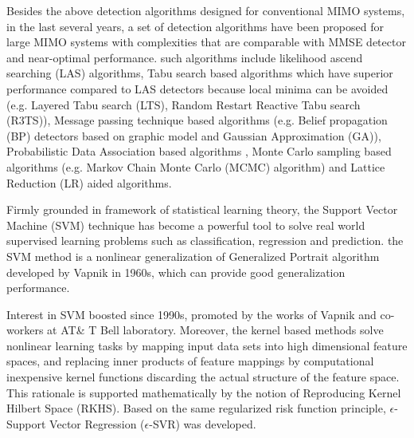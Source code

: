 \documentclass[12pt, draftclsnofoot, onecolumn]{IEEEtran}
\begin{document}
\begin{spacing}{2}
Besides the above detection algorithms designed for conventional MIMO systems, in the last several years, a set of detection algorithms have been proposed for large MIMO systems with complexities that are comparable with MMSE detector and near-optimal performance. such algorithms include likelihood ascend searching (LAS) algorithms\cite{vardhan2008low}\cite{li2010multiple}, %
Tabu search based algorithms which have superior performance compared to LAS detectors because local minima can be avoided (e.g. Layered Tabu search (LTS)\cite{srinidhi2011layered}, Random Restart Reactive Tabu search (R3TS)\cite{datta2010random}), Message passing technique based algorithms (e.g. Belief propagation (BP) detectors based on graphic model and Gaussian Approximation (GA)\cite{som2011low}\cite{som2010improved}\cite{narasimhan2014channel}\cite{goldberger2011mimo}), Probabilistic Data Association based algorithms \cite{mohammed2009low}, Monte Carlo sampling based algorithms (e.g. Markov Chain Monte Carlo (MCMC) algorithm\cite{datta2013novel}) and Lattice Reduction (LR) aided algorithms\cite{zhou2013element}.

Firmly grounded in framework of statistical learning theory, the Support Vector Machine (SVM) technique has become a powerful tool to solve real world supervised learning problems such as classification, regression and prediction. the SVM method is a nonlinear generalization of Generalized Portrait algorithm developed by Vapnik in 1960s\cite{vapnik1963pattern}\cite{vapnik1964note}, which can provide good generalization performance\cite{scholkopf2002learning}.

Interest in SVM boosted since 1990s, promoted by the works of Vapnik and co-workers at AT\& T Bell laboratory\cite{boser1992training}\cite{guyon1993automatic}\cite{vapnik2013nature}\cite{cortes1995support}\cite{scholkopf1996incorporating}\cite{vapnik1996support}.
Moreover, the kernel based methods\cite{scholkopf2002learning} solve nonlinear learning tasks by mapping input data sets into high dimensional feature spaces, and replacing inner products of feature mappings by computational inexpensive kernel functions discarding the actual structure of the feature space. This rationale is supported mathematically by the notion of Reproducing Kernel Hilbert Space (RKHS). 
Based on the same regularized risk function principle, $\epsilon$-Support Vector Regression ($\epsilon$-SVR) was developed\cite{vapnik2013nature}\cite{smola2004tutorial}.


\end{spacing}
\end{document}

